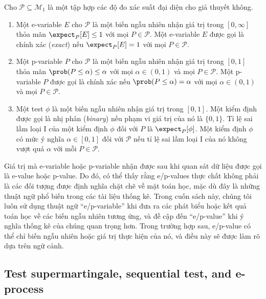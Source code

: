 \begin{defn}
  Cho $\mathcal{P} \subseteq \mathcal{M}_1$ là một tập hợp các độ đo xác suất
  đại diện cho giả thuyết không. \begin{enumerate}[label=(\roman*)]
    \item Một e-variable $E$ cho $\mathcal{P}$ là một biến ngẫu nhiên nhận
      giá trị trong $[0, \infty]$ thỏa mãn $\expect_P[E] \leq 1$ với mọi $P \in
      \mathcal{P}$. Một e-variable $E$ được gọi là chính xác (\emph{exact})
      nếu $\expect_P[E] = 1$ với mọi $P \in \mathcal{P}$.

    \item Một p-variable $P$ cho $\mathcal{P}$ là một biến ngẫu nhiên nhận giá
      trị trong $[0, 1]$ thỏa mãn $\prob(P \leq \alpha) \leq \alpha$ với mọi
      $\alpha \in (0, 1)$ và mọi $P \in \mathcal{P}$. Một p-variable $P$ được
      gọi là chính xác nếu $\prob(P \leq \alpha) = \alpha$ với mọi $\alpha \in
      (0, 1)$ và mọi $P \in \mathcal{P}$.

    \item Một \gls{test} $\phi$ là một biến ngẫu nhiên nhận giá trị trong
      $[0, 1]$. Một kiểm định được gọi là nhị phân (\emph{binary}) nếu phạm vi
      giá trị của nó là $\{0, 1\}$. Tỉ lệ sai lầm loại I của một kiểm định
      $\phi$ đối với $P$ là $\expect_P[\phi]$. Một kiểm định $\phi$
      có mức ý nghĩa $\alpha \in [0, 1]$ đối với $\mathcal{P}$ nếu tỉ lệ sai
      lầm loại I của nó không vượt quá $\alpha$ với mỗi $P \in \mathcal{P}$.
  \end{enumerate}
\end{defn}

Giá trị mà e-variable hoặc p-variable nhận được sau khi quan sát dữ liệu được
gọi là e-value hoặc p-value. Do đó, có thể thấy rằng e/p-values thực chất không
phải là các đối tượng được định nghĩa chặt chẽ về mặt toán học, mặc dù đây là
những thuật ngữ phổ biến trong các tài liệu thống kê. Trong cuốn sách này,
chúng tôi luôn sử dụng thuật ngữ ``e/p-variable'' khi đưa ra các phát biểu hoặc
kết quả toán học về các biến ngẫu nhiên tương ứng, và đề cập đến ``e/p-value''
khi ý nghĩa thống kê của chúng quan trọng hơn. Trong trường hợp sau, e/p-value
có thể chỉ biến ngẫu nhiên hoặc giá trị thực hiện của nó, và điều này sẽ được
làm rõ dựa trên ngữ cảnh.

\subsection{Test supermartingale, sequential test, and e-process}

